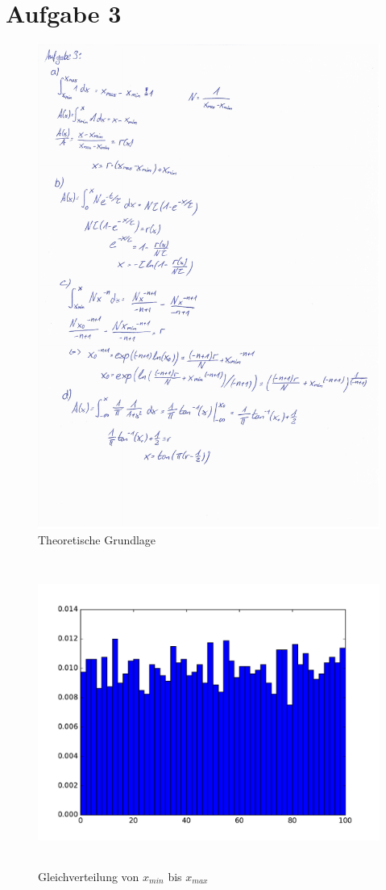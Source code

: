 \section*{Aufgabe 3}
\begin{figure}
  \centering
  \includegraphics[width=\textwidth]{aufg2.pdf}
  \caption{Theoretische Grundlage}
\end{figure}
\begin{figure}
  \centering
  \includegraphics[height=10cm]{Python/aufg3a.pdf}
  \caption{Gleichverteilung von $x_{min}$ bis $x_{max}$}
\end{figure}
